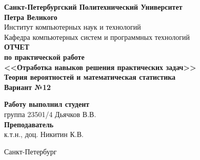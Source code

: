 \begin{titlepage}
\begin{center}
	\textbf{Санкт-Петербургский Политехнический Университет \\Петра Великого}\\[0.3cm]
	\small Институт компьютерных наук и технологий \\[0.3cm]
	\small Кафедра компьютерных систем и программных технологий\\[4cm]
	
	\textbf{ОТЧЕТ}\\ \textbf{по практической работе}\\[0.5cm]
	\textbf{<<Отработка навыков решения практических задач>>}\\[0.1cm]
	\textbf{Теория вероятностей и математическая статистика}\\[0.1cm]
	\textbf{Вариант №12}\\[7.0cm]
\end{center}

\begin{flushright}
	\begin{minipage}{0.48\textwidth}
		\begin{flushleft}
			\small \textbf{Работу выполнил студент}\\[3mm]
			\small группа 23501/4 \hspace*{6mm} Дьячков В.В.\\[5mm]
			
			\small \textbf{Преподаватель}\\[5mm]
		 	\small \sign[3cm] \hspace*{5mm} к.т.н., доц. Никитин К.В.\\[0.5cm]
		\end{flushleft}
	\end{minipage}
\end{flushright}

\vfill

\begin{center}
	\small Санкт-Петербург\\
	\small \the\year
\end{center}
\end{titlepage}